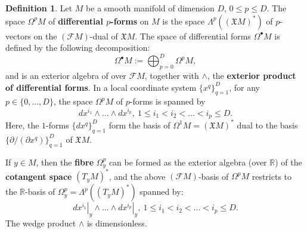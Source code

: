 \documentclass{elsarticle}
\theoremstyle{definition}
\newtheorem{definition}[theorem]{Definition}
\newcommand{\R}{\mathbb{R}}
\newcommand{\restrict}[2]{\left.#1\right|_{#2}}
\newcommand{\newterm}[1]{\textbf{#1}}
\begin{document}
\begin{definition}
  Let $M$ be a smooth manifold of dimension $D$, $0 \leq p \leq D$.
  The space $\Omega^p M$ of \newterm{differential $p$-forms} on $M$ is the space $\Lambda^p((\mathfrak{X} M)^*)$ of $p$-vectors on the $(\mathcal{F} M)$-dual of $\mathfrak{X} M$.
  The space of differential forms $\Omega^\bullet M$ is defined by the following decomposition:
  \begin{equation}
    \Omega^\bullet M := \bigoplus_{p = 0}^D \Omega^p M,
  \end{equation}
  and is an exterior algebra of over $\mathcal{F} M$, together with $\wedge$, the \newterm{exterior product of differential forms}.
  In a local coordinate system $\{x^q\}_{q = 1}^D$, for any $p \in \{0, ..., D\}$, the space $\Omega^p M$ of $p$-forms is spanned by
  \begin{equation}
    d x^{i_1} \wedge ... \wedge d x^{i_p},\
    1 \leq i_1 < i_2 < ... < i_p \leq D.
  \end{equation}
  Here, the $1$-forms $\{d x^q\}_{q = 1}^D$ form the basis of $\Omega^1 M = (\mathfrak{X} M)^*$ dual to the basis $\{\partial / (\partial x^q)\}_{q = 1}^D$ of $\mathfrak{X} M$.

  If $y \in M$, then the \newterm{fibre} $\Omega^p_y$ can be formed as the exterior algebra (over $\R$) of the \newterm{cotangent space} $(T_y M)^*$,
  and the above $(\mathcal{F} M)$-basis of $\Omega^p M$ restricts to the $\R$-basis of
  $\Omega^p_y = \Lambda^p((T_y M)^*)$ spanned by:
  \begin{equation}
    \restrict{d x^{i_1}}{y} \wedge ... \wedge \restrict{d x^{i_p}}{y},\
    1 \leq i_1 < i_2 < ... < i_p \leq D.
  \end{equation}
  The wedge product $\wedge$ is dimensionless.
\end{definition}
\end{document}
